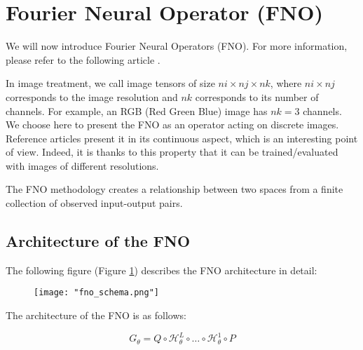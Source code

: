 \section{Fourier Neural Operator (FNO)} \label{FNO}
\graphicspath{{images/fourier}}


We will now introduce Fourier Neural Operators (FNO). For more information, please refer to the following article \cite{li_fourier_2021}. 

In image treatment, we call image tensors of size $ni\times nj\times nk$, where $ni\times nj$ corresponds to the image resolution and $nk$ corresponds to its number of channels. For example, an RGB (Red Green Blue) image has $nk=3$ channels. 
We choose here to present the FNO as an operator acting on discrete images. Reference articles present it in its continuous aspect, which is an interesting point of view. Indeed, it is thanks to this property that it can be trained/evaluated with images of different resolutions.

The FNO methodology creates a relationship between two spaces from a finite collection of observed input-output pairs. 


\subsection{Architecture of the FNO}

The following figure (Figure \ref{FNO_schema}) describes the FNO architecture in detail:

\begin{figure}[H]
	\texttt{[image: "fno\_schema.png"]}
	\label{FNO_schema}
\end{figure}

The architecture of the FNO is as follows:

\begin{equation*}
	G_\theta = Q \circ \mathcal{H}_\theta^L \circ \dots \circ \mathcal{H}_\theta^1 \circ P
\end{equation*}

